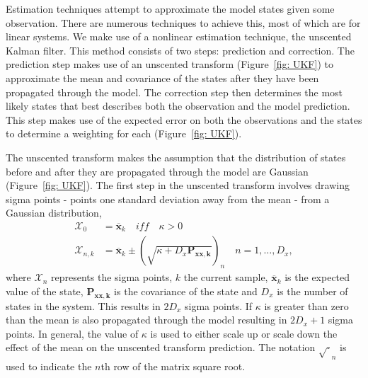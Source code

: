 
Estimation techniques attempt to approximate the model states given some observation. There are numerous techniques to achieve this, most of which are for linear systems. We make use of a nonlinear estimation technique, the unscented Kalman filter. This method consists of two steps: prediction and correction. The prediction step makes use of an unscented transform (Figure~\ref{fig: UKF}) to approximate the mean and covariance of the states after they have been propagated through the model. The correction step then determines the most likely states that best describes both the observation and the model prediction. This step makes use of the expected error on both the observations and the states to determine a weighting for each (Figure~\ref{fig: UKF}).

The unscented transform makes the assumption that the distribution of states before and after they are propagated through the model are Gaussian (Figure~\ref{fig: UKF}). The first step in the unscented transform involves drawing sigma points - points one standard deviation away from the mean - from a Gaussian distribution, 
\begin{align}\label{eqn: SigmaP}
\mathbf{\mathcal{X}}_{0} &= \mathbf{\overline{x}}_{k} \quad iff \quad \kappa >0\\
\mathbf{\mathcal{X}}_{n,k} &= \mathbf{\overline{x}}_{k} \pm (\sqrt{\kappa+D_{x}\mathbf{P_{xx,k}}})_{n} \quad n=1,\hdots,D_x,
\end{align} where $\mathbf{\mathcal{X}}_{n}$ represents the sigma points, $k$ the current sample, $\mathbf{\overline{x}}_{k}$ is the expected value of the state, $\mathbf{P_{xx,k}}$ is the covariance of the state and $D_{x}$ is the number of states in the system. This results in $2D_{x}$ sigma points. If $\kappa$ is greater than zero than the mean is also propagated through the model resulting in $2D_{x}+1$ sigma points. In general, the value of $\kappa$ is used to either scale up or scale down the effect of the mean on the unscented transform prediction. The notation $\sqrt{\cdot}_{n}$ is used to indicate the $n$th row of the matrix square root. 


